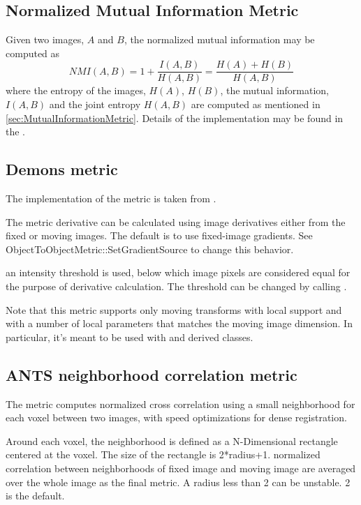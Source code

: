 \subsection{Normalized Mutual Information Metric}
Given two images, $A$ and $B$, the normalized mutual information may be computed as
\begin{equation}
NMI(A,B) = 1 + \frac{I(A,B)}{H(A,B)} = \frac{H(A) + H(B)}{H(A,B)}
\end{equation}
where the entropy of the images, $H(A)$, $H(B)$, the mutual
information, $I(A,B)$ and the joint entropy $H(A,B)$ are computed as mentioned
in \ref{sec:MutualInformationMetric}. Details of the implementation may be found in
the \cite{Hajnal2001}.

\subsection{Demons metric}

The implementation of the  metric is taken from
.

The metric derivative can be calculated using image derivatives
either from the fixed or moving images. The default is to use fixed-image
gradients. See ObjectToObjectMetric::SetGradientSource to change
this behavior.

an intensity threshold is used, below which image pixels are considered
equal for the purpose of derivative calculation. The threshold can be
changed by calling .

Note that this metric supports only moving transforms with local support and
with a number of local parameters that matches the moving image dimension.
In particular, it's meant to be used with 
and derived classes.


\subsection{ANTS neighborhood correlation metric}

The  metric computes
normalized cross correlation using a small neighborhood for each voxel between
two images, with speed optimizations for dense registration.

Around each voxel, the neighborhood is defined as a N-Dimensional
rectangle centered at the voxel. The size of the rectangle is 2*radius+1.
normalized correlation between neighborhoods of fixed image and moving
image are averaged over the whole image as the final metric.
A radius less than 2 can be unstable. 2 is the default.

